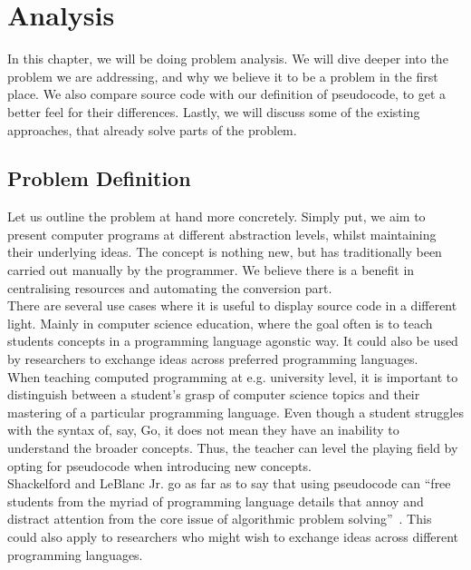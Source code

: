 \chapter{Analysis}

In this chapter, we will be doing problem analysis. We will dive deeper into the problem we are addressing, and why we believe it to be a problem in the first place. We also compare source code with our definition of pseudocode, to get a better feel for their differences. Lastly, we will discuss some of the existing approaches, that already solve parts of the problem.

\section{Problem Definition}

Let us outline the problem at hand more concretely. Simply put, we aim to present computer programs at different abstraction levels, whilst maintaining their underlying ideas. The concept is nothing new, but has traditionally been carried out manually by the programmer. We believe there is a benefit in centralising resources and automating the conversion part. \\

There are several use cases where it is useful to display source code in a different light. Mainly in computer science education, where the goal often is to teach students concepts in a programming language agonstic way. It could also be used by researchers to exchange ideas across preferred programming languages. \\

When teaching computed programming at e.g. university level, it is important to distinguish between a student's grasp of computer science topics and their mastering of a particular programming language. Even though a student struggles with the syntax of, say, Go, it does not mean they have an inability to understand the broader concepts. Thus, the teacher can level the playing field by opting for pseudocode when introducing new concepts. \\

Shackelford and LeBlanc Jr. go as far as to say that using pseudocode can ``free students from the myriad of programming language details that annoy and distract attention from the core issue of algorithmic problem solving''~\cite{dislikeProgLang}. This could also apply to researchers who might wish to exchange ideas across different programming languages. \\

